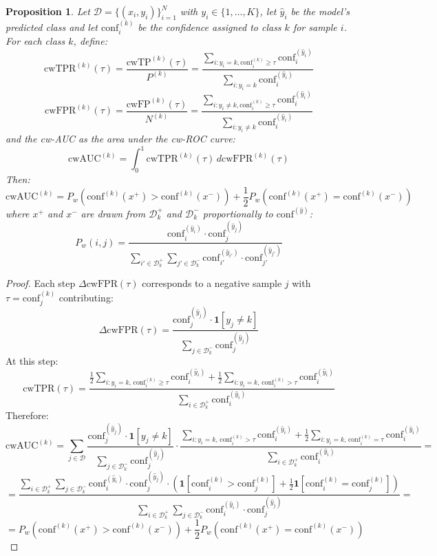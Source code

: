 \documentclass{article}
\theoremstyle{plain}
\newtheorem{theorem}{Proposition}
\theoremstyle{definition}
\theoremstyle{remark}
\begin{document}
\begin{theorem} \label{thorem:AUC}
Let $\mathcal{D} = \{(x_i, y_i)\}_{i=1}^N$ with $y_i \in \{1, \ldots, K\}$, let $\hat{y}_i$ be the model's predicted class and let $\text{conf}_i^{(k)}$ be the confidence assigned to class $k$ for sample $i$. For each class $k$, define: \[
\text{cwTPR}^{(k)}(\tau) = \frac{\text{cwTP}^{(k)}(\tau)}{P^{(k)}} = \frac{\sum_{i:y_i=k, \text{conf}_i^{(k)}\geq\tau} \text{conf}_i^{(\hat{y}_i)}}{\sum_{i:y_i=k} \text{conf}_i^{(\hat{y}_i)}} 
\]\[
\text{cwFPR}^{(k)}(\tau) = \frac{\text{cwFP}^{(k)}(\tau)}{N^{(k)}} = \frac{\sum_{i:y_i\neq k, \text{conf}_i^{(k)}\geq\tau} \text{conf}_i^{(\hat{y}_i)}}{\sum_{i:y_i\neq k} \text{conf}_i^{(\hat{y}_i)}} \]
and the cw-AUC as the area under the cw-ROC curve: \[
\text{cwAUC}^{(k)} = \int_0^1 \text{cwTPR}^{(k)}(\tau) \, d\text{cwFPR}^{(k)}(\tau) 
\] Then: \[
\text{cwAUC}^{(k)} = P_w\left(\text{conf}^{(k)}(x^+) > \text{conf}^{(k)}(x^-)\right) + \frac{1}{2}P_w\left(\text{conf}^{(k)}(x^+) = \text{conf}^{(k)}(x^-)\right)
\]
where $x^+$ and $x^-$ are drawn from $\mathcal{D}^+_k$ and $\mathcal{D}^-_k$ proportionally to $\text{conf}^{(\hat{y})}$: \[
P_w(i,j) = \frac{\text{conf}_i^{(\hat{y}_i)} \cdot \text{conf}_j^{(\hat{y}_j)}}{\sum_{i' \in \mathcal{D}^+_k}\sum_{j' \in \mathcal{D}^-_k} \text{conf}_{i'}^{(\hat{y}_{i'})} \cdot \text{conf}_{j'}^{(\hat{y}_{j'})}} 
\]
\end{theorem}
\begin{proof}
Each step $\Delta\text{cwFPR}(\tau)$ corresponds to a negative sample $j$ with $\tau = \text{conf}_j^{(k)}$ contributing: \[
\Delta\text{cwFPR}(\tau) = \frac{\text{conf}_j^{(\hat{y}_j)} \cdot  \mathbf{1}[y_j \neq k] }{\sum_{j \in \mathcal{D}^-_k}  \text{conf}_j^{(\hat{y}_j)}} 
\] At this step: \[ 
\text{cwTPR}(\tau) = \frac{ \frac{1}{2} \sum_{i:y_i=k,\, \text{conf}_i^{(k)} \geq \tau}\text{conf}_i^{(\hat{y}_i)} + \frac{1}{2}\sum_{i:y_i=k,\, \text{conf}_i^{(k)} > \tau}\text{conf}_i^{(\hat{y}_i)}}{\sum_{i \in \mathcal{D}^+_k} \text{conf}_i^{(\hat{y}_i)}}
\] Therefore: \[
\text{cwAUC}^{(k)} = \sum_{j \in \mathcal{D}} \frac{\text{conf}_j^{(\hat{y}_j)} \cdot  \mathbf{1}[y_j \neq k]  }{\sum_{j \in \mathcal{D}^-_k}  \text{conf}_j^{(\hat{y}_j)}} \cdot \frac{ \sum_{i:y_i=k,\, \text{conf}_i^{(k)} > \tau}\text{conf}_i^{(\hat{y}_i)} + \frac{1}{2}\sum_{i:y_i=k,\, \text{conf}_i^{(k)} = \tau}\text{conf}_i^{(\hat{y}_i)}  }{\sum_{i \in \mathcal{D}^+_k} \text{conf}_i^{(\hat{y}_i)}}  =
\] \[
 = \frac{\sum_{i \in \mathcal{D}^+_k}\sum_{j \in \mathcal{D}^-_k} \text{conf}_i^{(\hat{y}_i)} \cdot \text{conf}_j^{(\hat{y}_j)} \cdot \left(\mathbf{1}[\text{conf}_i^{(k)} > \text{conf}_j^{(k)}] + \frac{1}{2}\mathbf{1}[\text{conf}_i^{(k)} = \text{conf}_j^{(k)}]\right)}{\sum_{i \in \mathcal{D}^+_k}\sum_{j \in \mathcal{D}^-_k} \text{conf}_i^{(\hat{y}_i)} \cdot \text{conf}_j^{(\hat{y}_j)}} =
\]\[
= P_w\left(\text{conf}^{(k)}(x^+) > \text{conf}^{(k)}(x^-)\right) + \frac{1}{2}P_w\left(\text{conf}^{(k)}(x^+) = \text{conf}^{(k)}(x^-)\right)
\]
\end{proof}
\bigskip
\end{document}
